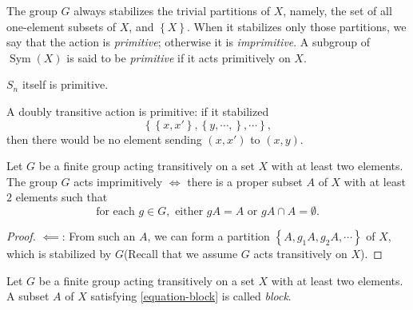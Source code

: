 \begin{definition}
  \label{definition-primitive-action}
  \label{definition-imprimitive-action}
  The group \( G \) always stabilizes the trivial partitions of \( X \), namely, the set of all one-element subsets of \( X \), and \( \left\lbrace X \right\rbrace \).
  When it stabilizes only those partitions, we say that the action is \emph{primitive}; otherwise it is \emph{imprimitive}.
  A subgroup of \( \operatorname{Sym}(X) \) is said to be \emph{primitive} if it acts primitively on \( X \).
\end{definition}

\begin{example}
  \label{example-symmetric-group-primitive}
  \( S_n \) itself is primitive.
\end{example}

\begin{example}
  \label{example-doubly-transitive-primitive}
  A doubly transitive action is primitive: if it stabilized
  \[
    \left\lbrace \left\lbrace x, x' \right\rbrace, \left\lbrace y, \cdots, \right\rbrace, \cdots \right\rbrace,
  \]
  then there would be no element sending \( (x, x') \) to \( (x, y) \).
\end{example}


\begin{proposition}
  \label{proposition-imprimitive-iff-condition}
  Let \( G \) be a finite group acting transitively on a set \( X \) with at least two elements.
  The group \( G \) acts imprimitively \( \iff \) there is a proper subset \( A \) of \( X \) with at least \( 2 \) elements such that
  \begin{equation}
    \text{for each } g \in G, \text{ either } gA = A \text{ or } gA \cap A = \emptyset. \label{equation-block}
  \end{equation}
\end{proposition}
\begin{proof}
  \( \impliedby \): From such an \( A \), we can form a partition \( \left\lbrace A, g_1 A, g_2 A, \cdots \right\rbrace \) of \( X \), which is stabilized by \( G \)(Recall that we assume \( G  \) acts transitively on \( X \)).
\end{proof}

\begin{definition}
  \label{definition-block}
  Let \( G \) be a finite group acting transitively on a set \( X \) with at least two elements.
  A subset \( A \) of \( X \) satisfying \ref{equation-block} is called \emph{block}.
\end{definition}

